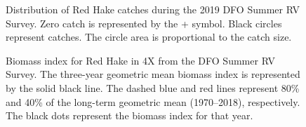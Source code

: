 \documentclass[11pt]{book}
\begin{document}
\begin{figure}[htb]

{\centering {} 

}

\caption{Distribution of Red Hake catches during the 2019 DFO Summer RV Survey. Zero catch is represented by the + symbol. Black circles represent catches. The circle area is proportional to the catch size.}\label{fig:108-map-redhake}
\end{figure}

\begin{figure}[htb]

{\centering {} 

}

\caption{Biomass index for Red Hake in 4X from the DFO Summer RV Survey. The three-year geometric mean biomass index is represented by the solid black line. The dashed blue and red lines represent 80\% and 40\% of the long-term geometric mean (1970--2018), respectively. The black dots represent the biomass index for that year.}\label{fig:109-fig-redhake-biomass4X}
\end{figure}
\end{document}
